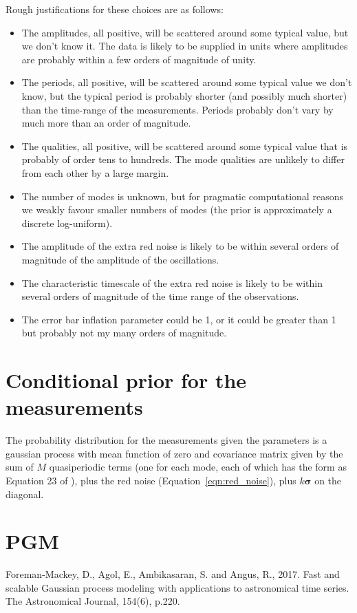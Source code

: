 \documentclass[a4paper, 12pt]{article}
\begin{document}
Rough justifications for these choices are as follows:
\begin{itemize}
    \item The amplitudes, all positive, will be scattered around some typical
          value, but we don't know it. The data is likely to be supplied
          in units where amplitudes are probably
          within a few orders of magnitude of unity.
    \item The periods, all positive, will be scattered around some typical
          value we don't know, but the typical period is probably shorter
          (and possibly much shorter) than the time-range of the measurements.
          Periods probably don't vary by much more than an order of magnitude.
    \item The qualities, all positive, will be scattered around some typical
          value that is probably of order tens to hundreds. The mode qualities
          are unlikely to differ from each other by a large margin.
    \item The number of modes is unknown, but for pragmatic computational
          reasons we weakly favour smaller numbers of modes (the prior
          is approximately a discrete log-uniform).
    \item The amplitude of the extra red noise is likely to be within
          several orders of magnitude of the amplitude of the oscillations.
    \item The characteristic timescale of the extra red noise is likely to
          be within several orders of magnitude of the time range of the
          observations.
    \item The error bar inflation parameter could be 1, or it could be
          greater than 1 but probably not my many orders of magnitude.
\end{itemize}

\section{Conditional prior for the measurements}

The probability distribution for the measurements given the parameters is
a gaussian process with mean function of zero and covariance matrix given
by the sum of $M$ quasiperiodic terms (one for each mode, each of which
has the form as Equation 23 of \citet{celerite}), plus the red noise
(Equation~\ref{eqn:red_noise}), plus $k\boldsymbol{\sigma}$ on the diagonal.

\section{PGM}

\begin{figure}[!ht]
\centering

\caption{\label{fig:pgm}}
\end{figure}

\begin{thebibliography}{999}
Foreman-Mackey, D., Agol, E., Ambikasaran, S. and Angus, R., 2017. Fast and scalable Gaussian process modeling with applications to astronomical time series. The Astronomical Journal, 154(6), p.220.
\end{thebibliography}
\end{document}
